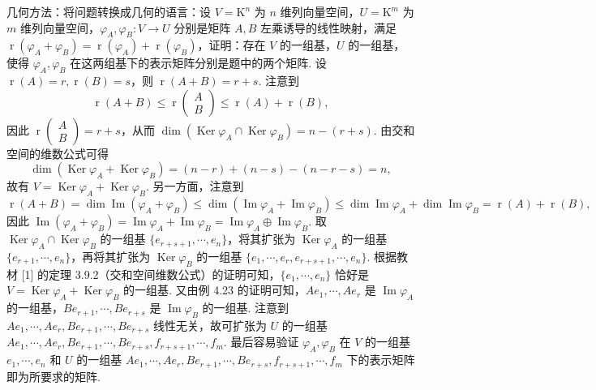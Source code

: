 \documentclass[UTF8, 12pt, fontset=fandol, oneside]{ctexart}
\begin{document}
几何方法：将问题转换成几何的语言：设 $V=\mathrm{K}^n$ 为 $n$ 维列向量空间，$U=\mathrm{K}^m$ 为 $m$ 维列向量空间，$\varphi_A,\varphi_B:V\to U$ 分别是矩阵 $A,B$ 左乘诱导的线性映射，满足 $\operatorname{r}(\varphi_A+\varphi_B)=\operatorname{r}(\varphi_A)+\operatorname{r}(\varphi_B)$，证明：存在 $V$ 的一组基，$U$ 的一组基，使得 $\varphi_A,\varphi_B$ 在这两组基下的表示矩阵分别是题中的两个矩阵. 设 $\operatorname{r}(A)=r,\operatorname{r}(B)=s$，则 $\operatorname{r}(A+B)=r+s$. 注意到
\[
\operatorname{r}(A+B)\le \operatorname{r}\left(\begin{array}{c}A\\B\end{array}\right)\le\operatorname{r}(A)+\operatorname{r}(B),
\]
因此 $\operatorname{r}\left(\begin{array}{c}A\\B\end{array}\right)=r+s$，从而 $\dim(\operatorname{Ker}\varphi_A\cap\operatorname{Ker}\varphi_B)=n-(r+s)$. 由交和空间的维数公式可得
\[
\dim(\operatorname{Ker}\varphi_A+\operatorname{Ker}\varphi_B)=(n-r)+(n-s)-(n-r-s)=n,
\]
故有 $V=\operatorname{Ker}\varphi_A+\operatorname{Ker}\varphi_B$. 另一方面，注意到
\[
\operatorname{r}(A+B)=\dim\operatorname{Im}(\varphi_A+\varphi_B)\le\dim(\operatorname{Im}\varphi_A+\operatorname{Im}\varphi_B)\le\dim\operatorname{Im}\varphi_A+\dim\operatorname{Im}\varphi_B=\operatorname{r}(A)+\operatorname{r}(B),
\]
因此 $\operatorname{Im}(\varphi_A+\varphi_B)=\operatorname{Im}\varphi_A+\operatorname{Im}\varphi_B=\operatorname{Im}\varphi_A\oplus\operatorname{Im}\varphi_B$. 取 $\operatorname{Ker}\varphi_A\cap\operatorname{Ker}\varphi_B$ 的一组基 $\{e_{r+s+1},\cdots,e_n\}$，将其扩张为 $\operatorname{Ker}\varphi_A$ 的一组基 $\{e_{r+1},\cdots,e_n\}$，再将其扩张为 $\operatorname{Ker}\varphi_B$ 的一组基 $\{e_1,\cdots,e_r,e_{r+s+1},\cdots,e_n\}$. 根据教材 [1] 的定理 3.9.2（交和空间维数公式）的证明可知，$\{e_1,\cdots,e_n\}$ 恰好是 $V=\operatorname{Ker}\varphi_A+\operatorname{Ker}\varphi_B$ 的一组基. 又由例 4.23 的证明可知，$Ae_1,\cdots,Ae_r$ 是 $\operatorname{Im}\varphi_A$ 的一组基，$Be_{r+1},\cdots,Be_{r+s}$ 是 $\operatorname{Im}\varphi_B$ 的一组基. 注意到 $Ae_1,\cdots,Ae_r,Be_{r+1},\cdots,Be_{r+s}$ 线性无关，故可扩张为 $U$ 的一组基 $Ae_1,\cdots,Ae_r,Be_{r+1},\cdots,Be_{r+s},f_{r+s+1},\cdots,f_m$. 最后容易验证 $\varphi_A,\varphi_B$ 在 $V$ 的一组基 $e_1,\cdots,e_n$ 和 $U$ 的一组基 $Ae_1,\cdots,Ae_r,Be_{r+1},\cdots,Be_{r+s},f_{r+s+1},\cdots,f_m$ 下的表示矩阵即为所要求的矩阵.
\end{document}
